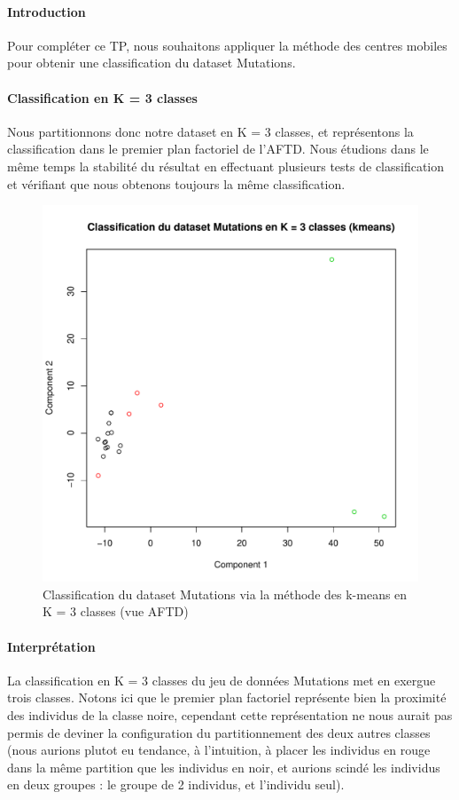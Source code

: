 \documentclass{report}
\begin{document}
\paragraph{Introduction}
Pour compléter ce TP, nous souhaitons appliquer la méthode des centres mobiles pour obtenir une classification du dataset Mutations.
\paragraph{Classification en K = 3 classes}
Nous partitionnons donc notre dataset en K = 3 classes, et représentons la classification dans le premier plan factoriel de l'AFTD. Nous étudions dans le même temps la stabilité du résultat en effectuant plusieurs tests de classification et vérifiant que nous obtenons toujours la même classification.
\begin{figure}[ht!]
\begin{center}
    \includegraphics[width=\textwidth]{../plots/E3Q7_1.pdf}
    \caption{Classification du dataset Mutations via la méthode des k-means en K = 3 classes (vue AFTD)}
\end{center}
\end{figure}
\paragraph{Interprétation}
La classification en K = 3 classes du jeu de données Mutations met en exergue trois classes. Notons ici que le premier plan factoriel représente bien la proximité des individus de la classe noire, cependant cette représentation ne nous aurait pas permis de deviner la configuration du partitionnement des deux autres classes (nous aurions plutot eu tendance, à l'intuition, à placer les individus en rouge dans la même partition que les individus en noir, et aurions scindé les individus en deux groupes : le groupe de 2 individus, et l'individu seul).
\end{document}
